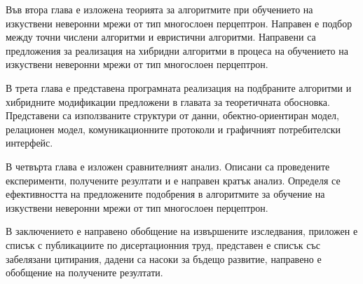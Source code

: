 Във втора глава е изложена теорията за алгоритмите при обучението на изкуствени неверонни мрежи от тип многослоен перцептрон. Направен е подбор между точни числени алгоритми и евристични алгоритми. Направени са предложения за реализация на хибридни алгоритми в процеса на обучението на изкуствени неверонни мрежи от тип многослоен перцептрон. 

В трета глава е представена програмната реализация на подбраните алгоритми и хибридните модификации предложени в главата за теоретичната обосновка. Представени са използваните структури от данни, обектно-ориентиран модел, релационен модел, комуникационните протоколи и графичният потребителски интерфейс. 

В четвърта глава е изложен сравнителният анализ. Описани са проведените експерименти, получените резултати и е направен кратък анализ. Определя се ефективността на предложените подобрения в алгоритмите за обучение на изкуствени неверонни мрежи от тип многослоен перцептрон.

В заключението е направено обобщение на извършените изследвания, приложен е списък с публикациите по дисертационния труд, представен е списък със забелязани цитирания, дадени са насоки за бъдещо развитие, направено е обобщение на получените резултати.

